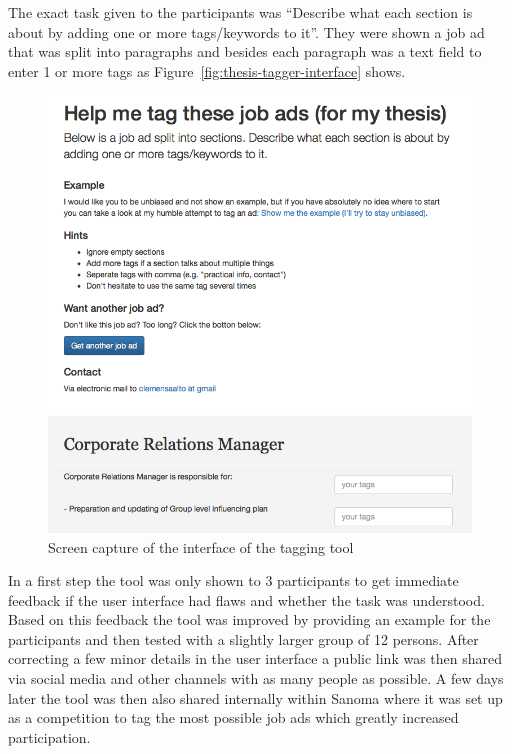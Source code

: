 The exact task given to the participants was ``Describe what each section is about by adding one or more tags/keywords to it''. They were shown a job ad that was split into paragraphs and besides each paragraph was a text field to enter 1 or more tags as Figure~\ref{fig:thesis-tagger-interface} shows.

\begin{figure}[h]
  \centering
  \includegraphics[width=\textwidth]{img/thesis-tagger-interface.png}
  \caption{Screen capture of the interface of the tagging tool}
\label{fig:thesis-tagger interface}
\end{figure}

In a first step the tool was only shown to 3 participants to get immediate feedback if the user interface had flaws and whether the task was understood. Based on this feedback the tool was improved by providing an example for the participants and then tested with a slightly larger group of 12 persons. After correcting a few minor details in the user interface a public link was then shared via social media and other channels with as many people as possible. A few days later the tool was then also shared internally within Sanoma where it was set up as a competition to tag the most possible job ads which greatly increased participation.

